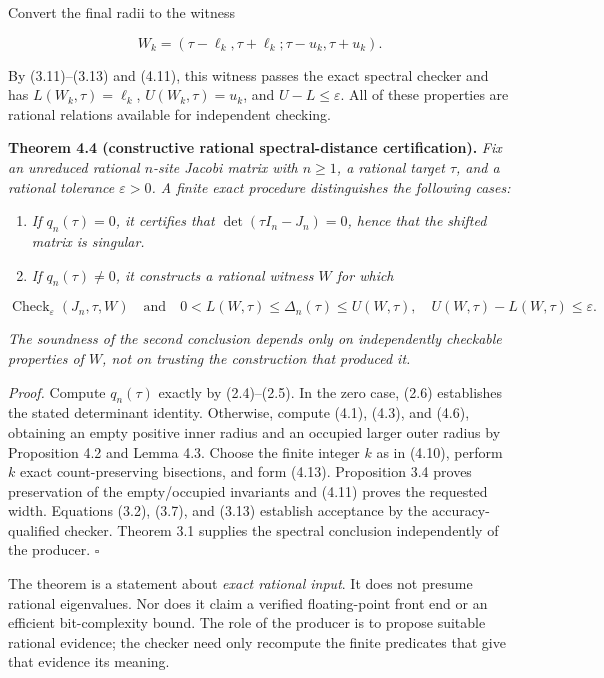 \documentclass[
  11pt,
]{article}
\providecommand{\tightlist}{%
  \setlength{\itemsep}{0pt}\setlength{\parskip}{0pt}}
\begin{document}
Convert the final radii to the witness

\[
W_k=(\tau-\ell_k,\tau+\ell_k;
      \tau-u_k,\tau+u_k).
\tag{4.13}
\]

By (3.11)--(3.13) and (4.11), this witness passes the exact spectral
checker and has \(L(W_k,\tau)=\ell_k\), \(U(W_k,\tau)=u_k\), and
\(U-L\le\varepsilon\). All of these properties are rational relations
available for independent checking.

\textbf{Theorem 4.4 (constructive rational spectral-distance
certification).} \emph{Fix an unreduced rational \(n\)-site Jacobi
matrix with \(n\ge1\), a rational target \(\tau\), and a rational
tolerance \(\varepsilon>0\). A finite exact procedure distinguishes the
following cases:}

\begin{enumerate}
\def\labelenumi{\arabic{enumi}.}
\tightlist
\item
  \emph{If \(q_n(\tau)=0\), it certifies that \(\det(\tau I_n-J_n)=0\),
  hence that the shifted matrix is singular.}
\item
  \emph{If \(q_n(\tau)\ne0\), it constructs a rational witness \(W\) for
  which}
\end{enumerate}

\[
\operatorname{Check}_{\varepsilon}(J_n,\tau,W)
\quad\text{and}\quad
0<L(W,\tau)\le\Delta_n(\tau)\le U(W,\tau),
\quad U(W,\tau)-L(W,\tau)\le\varepsilon.
\tag{4.14}
\]

\emph{The soundness of the second conclusion depends only on
independently checkable properties of \(W\), not on trusting the
construction that produced it.}

\emph{Proof.} Compute \(q_n(\tau)\) exactly by (2.4)--(2.5). In the zero
case, (2.6) establishes the stated determinant identity. Otherwise,
compute (4.1), (4.3), and (4.6), obtaining an empty positive inner
radius and an occupied larger outer radius by Proposition 4.2 and Lemma
4.3. Choose the finite integer \(k\) as in (4.10), perform \(k\) exact
count-preserving bisections, and form (4.13). Proposition 3.4 proves
preservation of the empty/occupied invariants and (4.11) proves the
requested width. Equations (3.2), (3.7), and (3.13) establish acceptance
by the accuracy-qualified checker. Theorem 3.1 supplies the spectral
conclusion independently of the producer. \(\square\)

The theorem is a statement about \emph{exact rational input}. It does
not presume rational eigenvalues. Nor does it claim a verified
floating-point front end or an efficient bit-complexity bound. The role
of the producer is to propose suitable rational evidence; the checker
need only recompute the finite predicates that give that evidence its
meaning.
\end{document}
